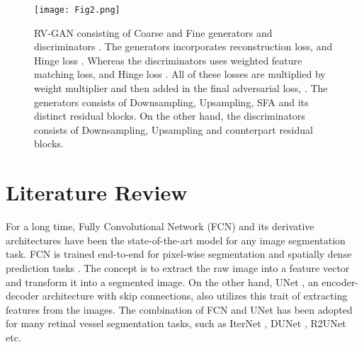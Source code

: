 \documentclass[runningheads]{llncs}
\begin{document}
\begin{figure}[t]
    \centering
    \texttt{[image: Fig2.png]}
    \caption{RV-GAN consisting of Coarse and Fine generators  and discriminators . The generators incorporates reconstruction loss,  and Hinge loss . Whereas the discriminators uses weighted feature matching loss,  and Hinge loss . All of these losses are multiplied by weight multiplier and then added in the final adversarial loss, . The generators consists of Downsampling, Upsampling, SFA and its distinct residual blocks. On the other hand, the discriminators consists of Downsampling, Upsampling and counterpart residual blocks. }
    \label{fig2}
\end{figure}
\iffalse
\section{Literature Review}


For a long time, Fully Convolutional Network (FCN) and its derivative architectures have been the state-of-the-art model for any image segmentation task. FCN is trained end-to-end for pixel-wise segmentation and spatially dense prediction tasks \cite{long2015fully,8673354}. The concept is to extract the raw image into a feature vector and transform it into a segmented image. On the other hand, UNet \cite{ronneberger2015u}, an encoder-decoder architecture with skip connections, also utilizes this trait of extracting features from the images. The combination of FCN and UNet has been adopted for many retinal vessel segmentation tasks, such as IterNet \cite{li2020iternet}, DUNet \cite{jin2019dunet}, R2UNet \cite{alom2018recurrent} etc. 
\end{document}
